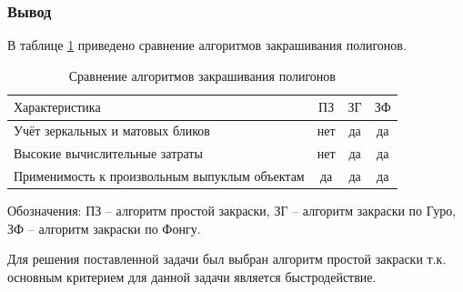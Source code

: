 	\subsubsection*{Вывод}
	\par В таблице \ref{table:LightCompare} приведено сравнение алгоритмов закрашивания полигонов.
	 \begin{table}[h!]
            \caption{Сравнение алгоритмов закрашивания полигонов}
            \centering
            \begin{tabular}{|l|c|c|c|}
            \hline
            $\text{Характеристика}$ & $\text{ПЗ}$ & $\text{ЗГ}$ & $\text{ЗФ}$\\ \hline
            $\text{Учёт зеркальных и матовых бликов}$ & нет & да & да\\ \hline
            $\text{Высокие вычислительные затраты}$ & нет & да & да\\ \hline
            $\text{Применимость к произвольным выпуклым объектам}$ & да & да & да\\ \hline
            \end{tabular}
            \label{table:LightCompare}
    \end{table}
    \par Обозначения: ПЗ -- алгоритм простой закраски, ЗГ -- алгоритм закраски по Гуро, ЗФ -- алгоритм закраски по Фонгу. 
    \par Для решения поставленной задачи был выбран алгоритм простой закраски т.к. основным критерием для данной задачи является быстродействие.
